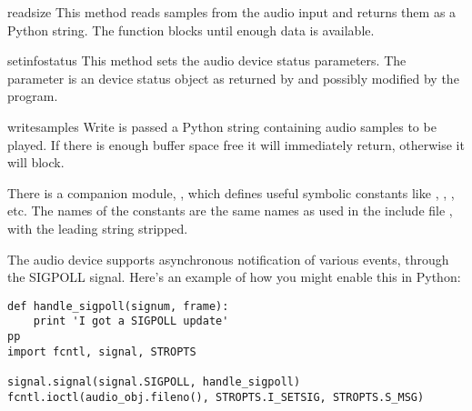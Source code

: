 \begin{methoddesc}{read}{size}
This method reads  samples from the audio input and returns
them as a Python string. The function blocks until enough data is available.
\end{methoddesc}

\begin{methoddesc}{setinfo}{status}
This method sets the audio device status parameters. The 
parameter is an device status object as returned by  and
possibly modified by the program.
\end{methoddesc}

\begin{methoddesc}{write}{samples}
Write is passed a Python string containing audio samples to be played.
If there is enough buffer space free it will immediately return,
otherwise it will block.
\end{methoddesc}

There is a companion module,
, which defines useful
symbolic constants like , ,
, etc. The names of the constants are the same names
as used in the \C{} include file , with the
leading string  stripped.

The audio device supports asynchronous notification of various events,
through the SIGPOLL signal.  Here's an example of how you might enable 
this in Python:

\begin{verbatim}
def handle_sigpoll(signum, frame):
    print 'I got a SIGPOLL update'
pp
import fcntl, signal, STROPTS

signal.signal(signal.SIGPOLL, handle_sigpoll)
fcntl.ioctl(audio_obj.fileno(), STROPTS.I_SETSIG, STROPTS.S_MSG)
\end{verbatim}
